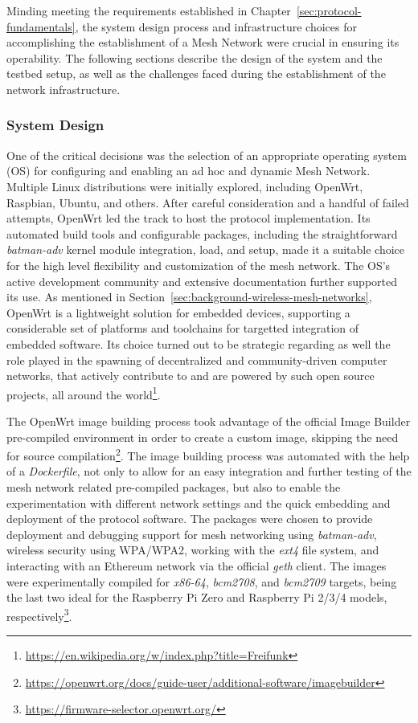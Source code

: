Minding meeting the requirements established in Chapter~\ref{sec:protocol-fundamentals}, the system design process and infrastructure choices for accomplishing the establishment of a Mesh Network were crucial in ensuring its operability. The following sections describe the design of the system and the testbed setup, as well as the challenges faced during the establishment of the network infrastructure.

\subsubsection{System Design} \label{sec:infrastructure}

One of the critical decisions was the selection of an appropriate operating system (OS) for configuring and enabling an ad hoc and dynamic Mesh Network. Multiple Linux distributions were initially explored, including OpenWrt, Raspbian, Ubuntu, and others. After careful consideration and a handful of failed attempts, OpenWrt led the track to host the protocol implementation. Its automated build tools and configurable packages, including the straightforward \emph{batman-adv} kernel module integration, load, and setup, made it a suitable choice for the high level flexibility and customization of the mesh network. The OS's active development community and extensive documentation further supported its use. As mentioned in Section~\ref{sec:background-wireless-mesh-networks}, OpenWrt is a lightweight solution for embedded devices, supporting a considerable set of platforms and toolchains for targetted integration of embedded software. Its choice turned out to be strategic regarding as well the role played in the spawning of decentralized and community-driven computer networks, that actively contribute to and are powered by such open source projects, all around the world\footnote{\url{https://en.wikipedia.org/w/index.php?title=Freifunk}}.

The OpenWrt image building process took advantage of the official Image Builder pre-compiled environment in order to create a custom image, skipping the need for source compilation\footnote{\url{https://openwrt.org/docs/guide-user/additional-software/imagebuilder}}. The image building process was automated with the help of a \emph{Dockerfile}, not only to allow for an easy integration and further testing of the mesh network related pre-compiled packages, but also to enable the experimentation with different network settings and the quick embedding and deployment of the \pol{} protocol software. The packages were chosen to provide deployment and debugging support for mesh networking using \emph{batman-adv}, wireless security using WPA/WPA2, working with the \emph{ext4} file system, and interacting with an Ethereum network via the official \emph{geth} client. The images were experimentally compiled for \emph{x86-64}, \emph{bcm2708}, and \emph{bcm2709} targets, being the last two ideal for the Raspberry Pi Zero and Raspberry Pi 2/3/4 models, respectively\footnote{\url{https://firmware-selector.openwrt.org/}}.

